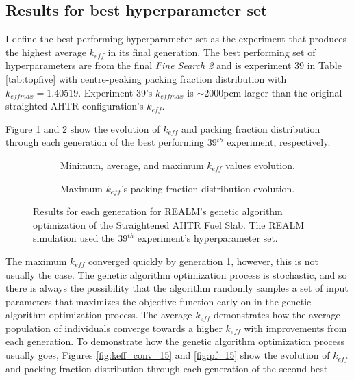 \subsection{Results for best hyperparameter set}
I define the best-performing hyperparameter set as the experiment that produces 
the highest average $k_{eff}$ in its final generation. 
The best performing set of hyperparameters are from the final 
\textit{Fine Search 2} and is experiment 39 in Table \ref{tab:topfive}
with centre-peaking packing fraction distribution with $k_{eff max} = 1.40519$. 
Experiment 39's $k_{eff max}$ is $\sim2000$pcm larger than the original 
straighted \gls{AHTR} configuration's $k_{eff}$. 

Figure \ref{fig:keff_conv_39} and \ref{fig:pf_39} show the evolution of $k_{eff}$ 
and packing fraction distribution through each generation of the best performing 
39$^{th}$ experiment, respectively. 
\begin{figure}[]
    \centering
    \begin{subfigure}{\textwidth}
    \caption{Minimum, average, and maximum $k_{eff}$ values evolution.}
    \label{fig:keff_conv_39}
    \end{subfigure}
    \begin{subfigure}{\textwidth}
        \caption{Maximum $k_{eff}$'s packing fraction distribution evolution.}
        \label{fig:pf_39}
    \end{subfigure}
    \caption{ Results for each generation for REALM's genetic algorithm optimization 
    of the Straightened \acrfull{AHTR} Fuel Slab. The REALM simulation used 
    the 39$^{th}$ experiment's hyperparameter set.}
    \label{fig:39}
\end{figure}
The maximum $k_{eff}$ converged quickly by generation 1, however, this is not 
usually the case. 
The genetic algorithm optimization process is stochastic, and so there is always 
the possibility that the algorithm randomly samples a set of input parameters
that maximizes the objective function early on in the genetic algorithm 
optimization process. 
The average $k_{eff}$ demonstrates how the average population of individuals converge 
towards a higher $k_{eff}$ with improvements from each generation. 
To demonstrate how the genetic algorithm optimization process usually goes, 
Figures \ref{fig:keff_conv_15} and \ref{fig:pf_15} show the evolution of $k_{eff}$ 
and packing fraction distribution through each generation of the second best 
